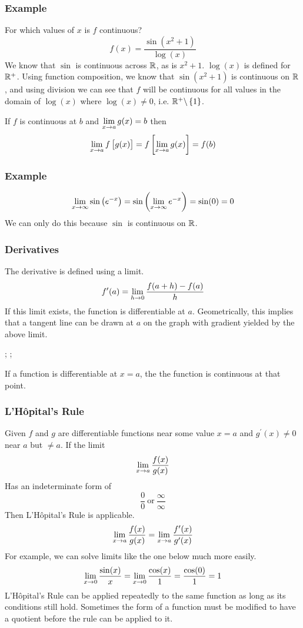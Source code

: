 \documentclass[12pt]{report}
\begin{document}
\begin{flushleft}
\subsubsection*{Example}
For which values of \(x\) is \(f\) continuous?
\[f(x) = \frac{\sin(x^2 + 1)}{\log(x)}\]
We know that \(\sin\) is continuous across \(\mathbb{R}\), as is \(x^2 + 1\). 
\(\log(x)\) is defined for \(\mathbb{R}^+\). Using function composition, we
know that \(\sin(x^2 + 1)\) is continuous on \(\mathbb{R}\), and using division we can
see that \(f\) will be continuous for all values in the domain of \(\log(x)\) 
where \(\log(x) \neq 0\), i.e. \(\mathbb{R}^+ \backslash \set{1}\).

\bigskip
If \(f\) is continuous at \(b\) and \(\lim\limits_{x\rightarrow a} g(x) = b\) then
\[\lim\limits_{x\rightarrow a} f\left[g(x)\right] 
= f\left[\lim\limits_{x\rightarrow a}g(x)\right] = f(b)\]

\subsubsection*{Example}
\[\lim\limits_{x\rightarrow\infty} \sin\left(e^{-x}\right)
= \sin\left(\lim\limits_{x\rightarrow\infty} e^{-x}\right) = \sin(0) = 0\]
We can only do this because \(\sin\) is continuous on \(\mathbb{R}\).

\subsubsection*{Derivatives}
The derivative is defined using a limit.
\[f^\prime(a) = \lim\limits_{h\rightarrow0}\frac{f(a + h) - f(a)}{h}\]
If this limit exists, the function is differentiable at \(a\). Geometrically,
this implies that a tangent line can be drawn at \(a\) on the graph with 
gradient yielded by the above limit.

\begin{plot}
    ;
    ;
\end{plot}

If a function is differentiable at \(x = a\), the the function is continuous
at that point.

\subsubsection*{L'H\^{o}pital's Rule}
Given \(f\) and \(g\) are differentiable functions near some value \(x = a\)
and \(g^\prime(x) \neq 0\) near \(a\) but \(\neq a\). If the limit
\[\lim\limits_{x\rightarrow a} \frac{f(x)}{g(x)}\]
Has an indeterminate form of
\[\frac{0}{0} \:\mathrm{or}\: \frac{\infty}{\infty}\]
Then L'H\^{o}pital's Rule is applicable.
\[\lim\limits_{x\rightarrow a}\frac{f(x)}{g(x)} 
= \lim\limits_{x\rightarrow a}\frac{f^\prime(x)}{g^\prime(x)}\]
For example, we can solve limits like the one below much more easily.
\[\lim\limits_{x\rightarrow0}\frac{\sin(x)}{x} 
= \lim\limits_{x\rightarrow0}\frac{\cos(x)}{1} = \frac{\cos(0)}{1} = 1\]
L'H\^{o}pital's Rule can be applied repeatedly to the same function as long
as its conditions still hold. Sometimes the form of a function must be modified
to have a quotient before the rule can be applied to it.


\end{flushleft}
\end{document}
